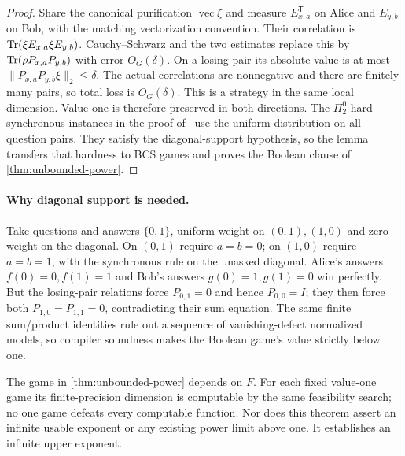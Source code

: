 \begin{proof}
Share the canonical purification $\operatorname{vec}\xi$ and measure $E_{x,a}^{\mathsf T}$ on Alice and $E_{y,b}$ on Bob, with the matching vectorization convention. Their correlation is $\operatorname{Tr}(\xi E_{x,a}\xi E_{y,b})$. Cauchy--Schwarz and the two estimates replace this by $\operatorname{Tr}(\rho P_{x,a}P_{y,b})$ with error $O_G(\delta)$. On a losing pair its absolute value is at most $\|P_{x,a}P_{y,b}\xi\|_2\le\delta$. The actual correlations are nonnegative and there are finitely many pairs, so total loss is $O_G(\delta)$. This is a strategy in the same local dimension. Value one is therefore preserved in both directions. The $\Pi^0_2$-hard synchronous instances in the proof of~\cite[Lemma~6.7]{MNY22} use the uniform distribution on all question pairs. They satisfy the diagonal-support hypothesis, so the lemma transfers that hardness to BCS games and proves the Boolean clause of \cref{thm:unbounded-power}.
\end{proof}

\paragraph{Why diagonal support is needed.}
Take questions and answers $\{0,1\}$, uniform weight on $(0,1),(1,0)$ and zero weight on the diagonal. On $(0,1)$ require $a=b=0$; on $(1,0)$ require $a=b=1$, with the synchronous rule on the unasked diagonal. Alice's answers $f(0)=0,f(1)=1$ and Bob's answers $g(0)=1,g(1)=0$ win perfectly. But the losing-pair relations force $P_{0,1}=0$ and hence $P_{0,0}=I$; they then force both $P_{1,0}=P_{1,1}=0$, contradicting their sum equation. The same finite sum/product identities rule out a sequence of vanishing-defect normalized models, so compiler soundness makes the Boolean game's value strictly below one.

The game in \cref{thm:unbounded-power} depends on $F$. For each fixed value-one game its finite-precision dimension is computable by the same feasibility search; no one game defeats every computable function. Nor does this theorem assert an infinite usable exponent or any existing power limit above one. It establishes an infinite upper exponent.
